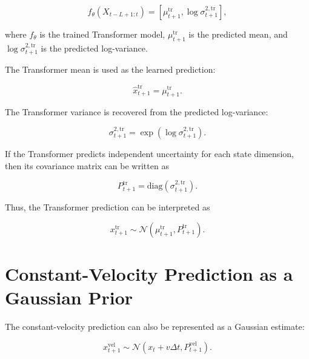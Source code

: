 \documentclass[a4paper]{article}
\begin{document}
        \[
            f_{\theta}
            \left(
                X_{t-L+1:t}
            \right)
            =
            \left[
                \mu_{t+1}^{\mathrm{tr}},
                \log \sigma_{t+1}^{2,\mathrm{tr}}
            \right],
        \]
        
        where \(f_{\theta}\) is the trained Transformer model, \(\mu_{t+1}^{\mathrm{tr}}\) is the predicted mean, and \(\log \sigma_{t+1}^{2,\mathrm{tr}}\) is the predicted log-variance.
        
        The Transformer mean is used as the learned prediction:
        
        \[
            \hat{x}_{t+1}^{\mathrm{tr}}
            =
            \mu_{t+1}^{\mathrm{tr}}.
        \]
        
        The Transformer variance is recovered from the predicted log-variance:
        
        \[
            \sigma_{t+1}^{2,\mathrm{tr}}
            =
            \exp
            \left(
                \log \sigma_{t+1}^{2,\mathrm{tr}}
            \right).
        \]
        
        If the Transformer predicts independent uncertainty for each state dimension, then its covariance matrix can be written as
        
        \[
            P_{t+1}^{\mathrm{tr}}
            =
            \mathrm{diag}
            \left(
                \sigma_{t+1}^{2,\mathrm{tr}}
            \right).
        \]
        
        Thus, the Transformer prediction can be interpreted as
        
        \[
            x_{t+1}^{\mathrm{tr}}
            \sim
            \mathcal{N}
            \left(
                \mu_{t+1}^{\mathrm{tr}},
            P_{t+1}^{\mathrm{tr}}
            \right).
        \]
    
    
    \section{Constant-Velocity Prediction as a Gaussian Prior}
        
        The constant-velocity prediction can also be represented as a Gaussian estimate:
        
        \[
            x_{t+1}^{\mathrm{vel}}
            \sim
            \mathcal{N}
            \left(
                x_t
                +
                v\Delta t,
            P_{t+1}^{\mathrm{vel}}
            \right).
        \]
        
\end{document}
